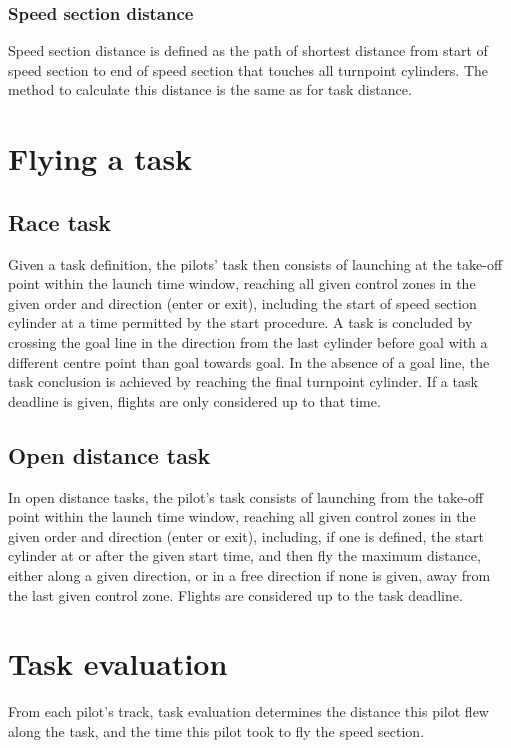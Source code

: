 \documentclass{article}
\begin{document}
\subsubsection{Speed section distance}
Speed section distance is defined as the path of shortest distance from start
of speed section to end of speed section that touches all turnpoint cylinders.
The method to calculate this distance is the same as for task distance.

\newpage
\section{Flying a task}
\subsection{Race task}
Given a task definition, the pilots’ task then consists of launching at the
take-off point within the launch time window, reaching all given control zones
in the given order and direction (enter or exit), including the start of speed
section cylinder at a time permitted by the start procedure. A task is
concluded by crossing the goal line in the direction from the last cylinder
before goal with a different centre point than goal towards goal. In the
absence of a goal line, the task conclusion is achieved by reaching the final
turnpoint cylinder. If a task deadline is given, flights are only considered up
to that time.

\subsection{Open distance task}
In open distance tasks, the pilot’s task consists of launching from the
take-off point within the launch time window, reaching all given control zones
in the given order and direction (enter or exit), including, if one is defined,
the start cylinder at or after the given start time, and then fly the maximum
distance, either along a given direction, or in a free direction if none is
given, away from the last given control zone. Flights are considered up to the
task deadline.

\newpage
\section{Task evaluation}
From each pilot’s track, task evaluation determines the distance this pilot
flew along the task, and the time this pilot took to fly the speed section.
\end{document}
